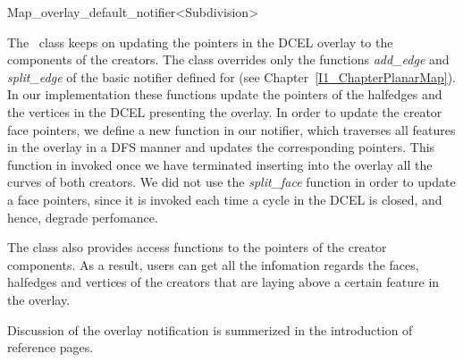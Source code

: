 
\ccRefPageBegin


\renewcommand{\ccRefPageBegin}{\begin{ccAdvanced}}
\renewcommand{\ccRefPageEnd}{\end{ccAdvanced}}

\begin{ccRefClass}{Map_overlay_default_notifier<Subdivision>}
\label{OVL_sec:notifier}

The \ccRefName\ class keeps on updating the pointers in the 
DCEL overlay to the components of the creators.
The \ccRefName class overrides only the functions {\it add\_edge} 
and {\it split\_edge} of the basic notifier defined for 
(see Chapter~\ref{I1_ChapterPlanarMap}). In our implementation these functions update 
the pointers of the halfedges and the vertices in the DCEL presenting the overlay.
In order to update the creator face pointers, we define a new function in our notifier, 
which traverses all features in the overlay in a DFS manner and updates the 
corresponding pointers. This function in invoked once we have terminated 
inserting into the overlay all the curves of both creators.
We did not use the {\it split\_face} function in order to update a face pointers, 
since it is invoked each time a cycle in the DCEL is closed, and hence, degrade perfomance.

The \ccRefName class also provides access functions to the pointers of the 
creator components. As a result, users can get all the infomation regards the 
faces, halfedges and vertices of the creators that are laying above a certain feature 
in the overlay.


\ccIsModel

\ccInheritsFrom

\ccSeeAlso
   Discussion of the overlay notification is summerized in the introduction
   of  reference pages.

\end{ccRefClass}
\renewcommand{\ccRefPageBegin}{}
\renewcommand{\ccRefPageEnd}{}


\ccRefPageEnd
